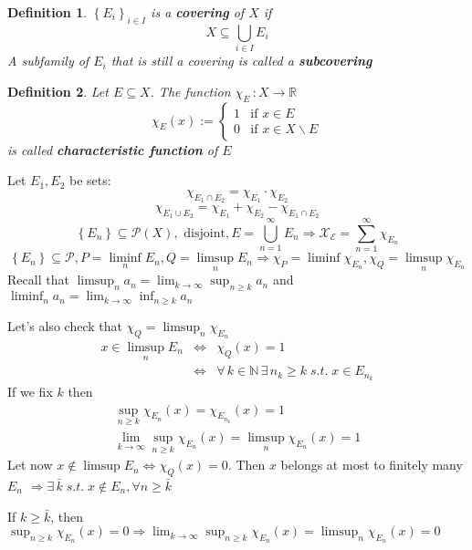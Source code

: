 \documentclass[a4paper,12pt]{article}
\theoremstyle{break}
\newtheorem{definition}{Definition}[section]
\numberwithin{equation}{section}
\begin{document}
\begin{definition}
    \(\left\lbrace E_i \right\rbrace_{i \in I}\) is a \textbf{covering} of \(X\) if 
    \[
        X \subseteq \bigcup_{i \in I} E_i
    \]
A subfamily of \(E_i\) that is still a covering is called a \textbf{subcovering}
\end{definition}
\begin{definition}
    Let \(E \subseteq X\). The function \(\chi_E \, : X \rightarrow \mathbb{R}\) 
    \[
        \chi_E (x):= \begin{cases}
            1 & \mbox{if } x \in E \\
            0 & \mbox{if } x \in X\backslash E
        \end{cases}
    \]
    is called \textbf{characteristic function} of \(E\)
\end{definition}
Let \(E_1, E_2\) be sets:
\[
    \chi_{E_1 \cap E_2} = \chi_{E_1} \cdot \chi_{E_2}
\]
\[
    \chi_{E_1 \cup E_2} = \chi_{E_1} + \chi_{E_2} - \chi_{E_1 \cap E_2} 
\]
\[
    \left\lbrace E_n \right\rbrace \subseteq \mathcal{P}(X), \mbox{ disjoint}, E = \bigcup_{n = 1}^{\infty} E_n \Longrightarrow \mathcal{X_E} = \sum_{n = 1}^{\infty} \chi_{E_n}
\]
\[
    \left\lbrace E_n \right\rbrace \subseteq \mathcal{P}, P = \liminf_n E_n, Q = \limsup_n E_n \Longrightarrow \chi_P = \liminf \chi_{E_n}, \chi_Q = \limsup_n \chi_{E_n}
\]
Recall that \(\limsup_n a_n = \lim_{k \to \infty} \sup_{n \geq k} a_n\) and \(\liminf_n a_n = \lim_{k \to \infty} \inf_{n \geq k} a_n\)


Let's also check that \(\chi_Q = \limsup_n \chi_{E_n}\)
\[
    \begin{array}{ccc}   
    x \in \limsup_n E_n & \Longleftrightarrow & \chi_Q(x) = 1 \\
    & \Longleftrightarrow & \forall \, k \in \mathbb{N} \, \exists \, n_k \geq k \; s.t. \; x \in E_{n_k}
    \end{array}
    \]
If we fix \(k\) then 
\[
    \begin{array}{c}
        \sup_{n \geq k} \chi_{E_n}(x) = \chi_{E_{n_k}}(x) = 1 \\
        \lim_{k \to \infty} \sup_{n \geq k} \chi_{E_n}(x) = \limsup_n \chi_{E_n}(x) = 1
    \end{array}
\]
    Let now \(x \not \in \limsup E_n \Longleftrightarrow \chi_Q(x) = 0\).
    Then \(x\) belongs at most to finitely many \(E_n\) \(\Longrightarrow \exists \, \bar{k}\; s.t. \; x \not \in E_n, \forall n \geq \bar{k}\)
    
    If \(k \geq \bar{k}\), then \(\sup_{n \geq k} \chi_{E_n} (x) = 0 \Longrightarrow \lim_{k \to \infty} \sup_{n \geq k} \chi_{E_n}(x) = \limsup_n \chi_{E_n} (x) = 0\)
\end{document}
